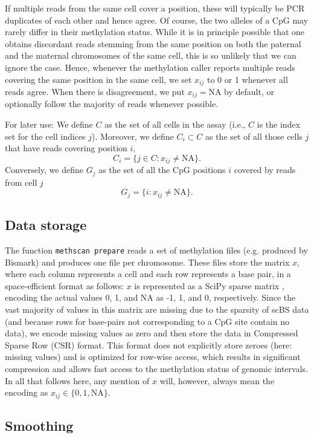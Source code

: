 \documentclass[10pt]{article}
\begin{document}
If multiple reads from the same cell cover a position, these will typically be PCR duplicates of each other and hence agree.
Of course, the two alleles of a CpG may rarely differ in their methylation status.
While it is in principle possible that one obtains discordant reads stemming from the same position on both the paternal and the maternal chromosomes of the same cell, this is so unlikely that we can ignore the case.
Hence, whenever the methylation caller reports multiple reads covering the same position in the same cell, we set $x_{ij}$ to 0 or 1 whenever all reads agree.
When there is disagreement, we put $x_{ij}=\text{NA}$ by default, or optionally follow the majority of reads whenever possible.

For later use: We define $C$ as the set of all cells in the assay (i.e., $C$ is the index set for the cell indices $j$).
Moreover, we define $C_i\subset C$ as the set of all those cells $j$ that have reads covering position $i$,
\[ C_i=\{j\in C: x_{ij}\neq\text{NA}\}.\]
Conversely, we define $G_j$ as the set of all the CpG positions $i$ covered by reads from cell $j$ 
\[ G_j=\{i: x_{ij}\neq\text{NA}\}.\]

\subsection*{Data storage}

The function \texttt{methscan prepare} reads a set of methylation files (e.g. produced by Bismark) and produces one file per chromosome.
These files store the matrix $x$, where each column represents a cell and each row represents a base pair, in a space-efficient format as follows:
$x$ is represented as a SciPy sparse matrix \citep{SciPy}, encoding the actual values 0, 1, and NA as -1, 1, and 0, respectively.
Since the vast majority of values in this matrix are missing due to the sparsity of scBS data (and because rows for base-pairs not corresponding to a CpG site contain no data), we encode missing values as zero and then store the data in Compressed Sparse Row (CSR) format.
This format does not explicitly store zeroes (here: missing values) and is optimized for row-wise access, which results in significant compression and allows fast access to the methylation status of genomic intervals.
In all that follows here, any mention of $x$ will, however, always mean the encoding as $x_{ij}\in\{0,1,\text{NA}\}$.

\subsection*{Smoothing}
\end{document}
